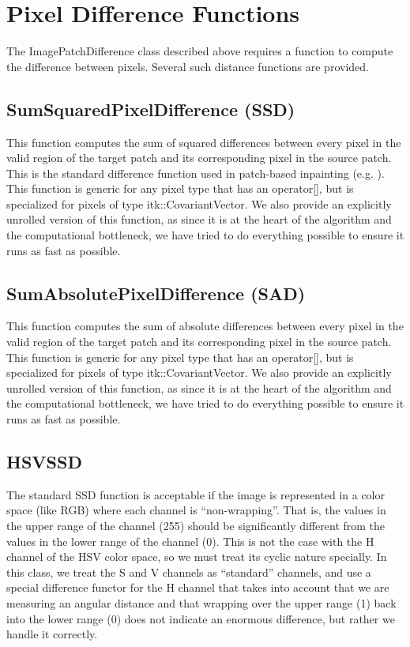 \documentclass{InsightArticle}
\begin{document}
\section{Pixel Difference Functions}
\label{sec:PatchMatching}
The ImagePatchDifference class described above requires a function to compute the difference between pixels. Several such distance functions are provided.

\subsection{SumSquaredPixelDifference (SSD)}
This function computes the sum of squared differences between every pixel in the valid region of the target patch and its corresponding pixel in the source patch. This is the standard difference function used in patch-based inpainting (e.g. \cite{criminisi}). This function is generic for any pixel type that has an operator[], but is specialized for pixels of type itk::CovariantVector. We also provide an explicitly unrolled version of this function, as since it is at the heart of the algorithm and the computational bottleneck, we have tried to do everything possible to ensure it runs as fast as possible.

\subsection{SumAbsolutePixelDifference (SAD)}
This function computes the sum of absolute differences between every pixel in the valid region of the target patch and its corresponding pixel in the source patch. This function is generic for any pixel type that has an operator[], but is specialized for pixels of type itk::CovariantVector. We also provide an explicitly unrolled version of this function, as since it is at the heart of the algorithm and the computational bottleneck, we have tried to do everything possible to ensure it runs as fast as possible.


\subsection{HSVSSD}
The standard SSD function is acceptable if the image is represented in a color space (like RGB) where each channel is ``non-wrapping''. That is, the values in the upper range of the channel (255) should be significantly different from the values in the lower range of the channel (0). This is not the case with the H channel of the HSV color space, so we must treat its cyclic nature specially. In this class, we treat the S and V channels as ``standard'' channels, and use a special difference functor for the H channel that takes into account that we are measuring an angular distance and that wrapping over the upper range (1) back into the lower range (0) does not indicate an enormous difference, but rather we handle it correctly.
\end{document}
